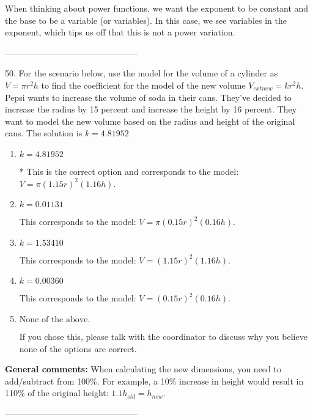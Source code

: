 \documentclass{extbook}[14pt]
\begin{document}
When thinking about power functions, we want the exponent to be constant and the base to be a variable (or variables). In this case, we see variables in the exponent, which tips us off that this is not a power variation.

-----------------------------------------------

50. For the scenario below, use the model for the volume of a cylinder as $V = \pi r^2 h$ to find the coefficient for the model of the new volume $V_{	ext{new}} = k r^2 h$.
Pepsi wants to increase the volume of soda in their cans. They've decided to increase the radius by 15 percent and increase the height by 16 percent. They want to model the new volume based on the radius and height of the original cans. 
The solution is $ k = 4.81952 $ 

\begin{enumerate}[label=\Alph*.] 
\item $ k = 4.81952 $ 

 * This is the correct option and corresponds to the model: $V = \pi (1.15 r)^2 (1.16 h)$. 
\item $ k = 0.01131 $ 

 This corresponds to the model: $V = \pi (0.15 r)^2 (0.16 h)$. 
\item $ k = 1.53410 $ 

 This corresponds to the model: $V = (1.15 r)^2 (1.16 h)$. 
\item $ k = 0.00360 $ 

 This corresponds to the model: $V = (0.15 r)^2 (0.16 h)$. 
\item $ \text{None of the above.} $ 

 If you chose this, please talk with the coordinator to discuss why you believe none of the options are correct. 
\end{enumerate} 
 
\textbf{General comments:} When calculating the new dimensions, you need to add/subtract from 100\%. For example, a 10\% increase in height would result in 110\% of the original height: $1.1h_{old} = h_{new}$.

-----------------------------------------------
\end{document}
